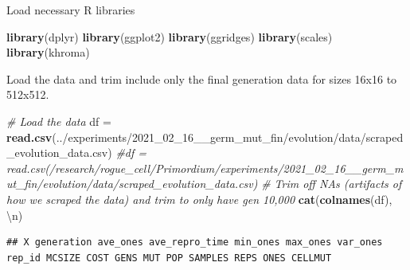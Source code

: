 \documentclass[
]{book}
\newenvironment{Shaded}{\begin{snugshade}}{\end{snugshade}}
\newcommand{\CharTok}[1]{\textcolor[rgb]{0.31,0.60,0.02}{#1}}
\newcommand{\CommentTok}[1]{\textcolor[rgb]{0.56,0.35,0.01}{\textit{#1}}}
\newcommand{\DecValTok}[1]{\textcolor[rgb]{0.00,0.00,0.81}{#1}}
\newcommand{\KeywordTok}[1]{\textcolor[rgb]{0.13,0.29,0.53}{\textbf{#1}}}
\newcommand{\NormalTok}[1]{#1}
\newcommand{\OperatorTok}[1]{\textcolor[rgb]{0.81,0.36,0.00}{\textbf{#1}}}
\newcommand{\StringTok}[1]{\textcolor[rgb]{0.31,0.60,0.02}{#1}}
\begin{document}
Load necessary R libraries

\begin{Shaded}
\begin{Highlighting}[]
\KeywordTok{library}\NormalTok{(dplyr)}
\KeywordTok{library}\NormalTok{(ggplot2)}
\KeywordTok{library}\NormalTok{(ggridges)}
\KeywordTok{library}\NormalTok{(scales)}
\KeywordTok{library}\NormalTok{(khroma)}
\end{Highlighting}
\end{Shaded}

Load the data and trim include only the final generation data for sizes 16x16 to 512x512.

\begin{Shaded}
\begin{Highlighting}[]
\CommentTok{\# Load the data}
\NormalTok{df =}\StringTok{ }\KeywordTok{read.csv}\NormalTok{(}\StringTok{\textquotesingle{}../experiments/2021\_02\_16\_\_germ\_mut\_fin/evolution/data/scraped\_evolution\_data.csv\textquotesingle{}}\NormalTok{)}
\CommentTok{\#df = read.csv(\textquotesingle{}/research/rogue\_cell/Primordium/experiments/2021\_02\_16\_\_germ\_mut\_fin/evolution/data/scraped\_evolution\_data.csv\textquotesingle{})}
\CommentTok{\# Trim off NAs (artifacts of how we scraped the data) and trim to only have gen 10,000}
\KeywordTok{cat}\NormalTok{(}\KeywordTok{colnames}\NormalTok{(df), }\StringTok{\textquotesingle{}}\CharTok{\textbackslash{}n}\StringTok{\textquotesingle{}}\NormalTok{)}
\end{Highlighting}
\end{Shaded}

\begin{verbatim}
## X generation ave_ones ave_repro_time min_ones max_ones var_ones rep_id MCSIZE COST GENS MUT POP SAMPLES REPS ONES CELLMUT
\end{verbatim}

\begin{Shaded}
\end{Shaded}
\end{document}

